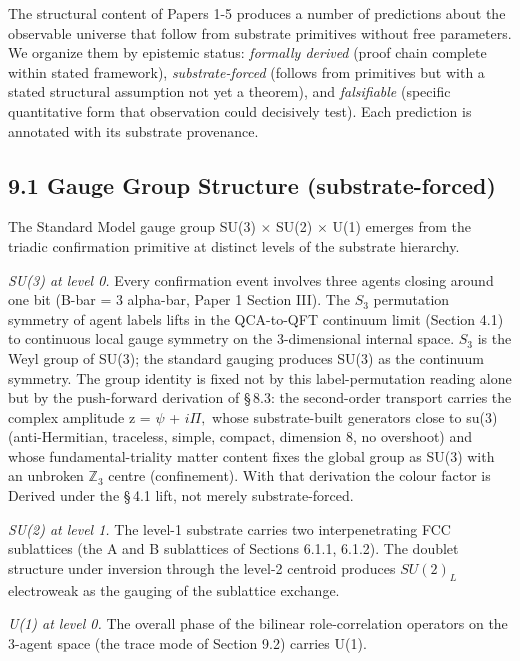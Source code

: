 \documentclass[11pt,oneside]{report}
\theoremstyle{definition}
\theoremstyle{remark}
\begin{document}
The structural content of Papers 1-5 produces a number of predictions
about the observable universe that follow from substrate primitives
without free parameters. We organize them by epistemic status:
\emph{formally derived} (proof chain complete within stated framework),
\emph{substrate-forced} (follows from primitives but with a stated
structural assumption not yet a theorem), and \emph{falsifiable}
(specific quantitative form that observation could decisively test).
Each prediction is annotated with its substrate provenance.

\subsection*{9.1 Gauge Group Structure (substrate-forced)}

The Standard Model gauge group SU(3) \ensuremath{\times} SU(2) \ensuremath{\times} U(1) emerges from the
triadic confirmation primitive at distinct levels of the substrate
hierarchy.

\emph{SU(3) at level 0.} Every confirmation event involves three agents
closing around one bit (B-bar = 3 alpha-bar, Paper 1 Section III). The
\ensuremath{S_{3}} permutation symmetry of agent labels lifts in the QCA-to-QFT
continuum limit (Section 4.1) to continuous local gauge symmetry on the
3-dimensional internal space. \ensuremath{S_{3}} is the Weyl group of SU(3); the
standard gauging produces SU(3) as the continuum symmetry. The group
identity is fixed not by this label-permutation reading alone but by the
push-forward derivation of \S\,8.3: the second-order transport carries the
complex amplitude z = \ensuremath{\psi} + \ensuremath{i\Pi ,} whose substrate-built generators close to
su(3) (anti-Hermitian, traceless, simple, compact, dimension 8, no
overshoot) and whose fundamental-triality matter content fixes the
global group as SU(3) with an unbroken \ensuremath{\mathbb{Z}_{3}} centre (confinement). With
that derivation the colour factor is Derived under the \S\,4.1 lift, not
merely substrate-forced.

\emph{SU(2) at level 1.} The level-1 substrate carries two
interpenetrating FCC sublattices (the A and B sublattices of Sections
6.1.1, 6.1.2). The doublet structure under inversion through the level-2
centroid produces \ensuremath{SU(2)_{L}} electroweak as the gauging of the sublattice
exchange.

\emph{U(1) at level 0.} The overall phase of the bilinear
role-correlation operators on the 3-agent space (the trace mode of
Section 9.2) carries U(1).
\end{document}

